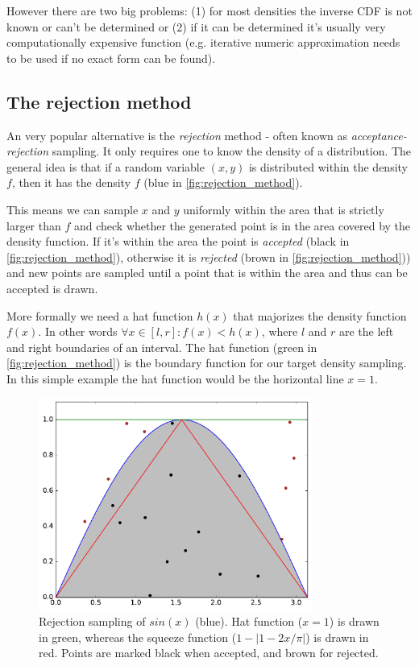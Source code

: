 \documentclass[]{article}
\begin{document}
However there are two big problems: (1) for most densities the inverse CDF is not known or can't be determined or (2) if it can be determined it's usually very computationally expensive function (e.g. iterative numeric approximation needs to be used if no exact form can be found).

\subsection{The rejection method}

An very popular alternative is the \textit{rejection} method - often known as \textit{acceptance-rejection} sampling. It only requires one to know the density of a distribution. The general idea is that if a random variable $(x, y)$ is distributed within the density $f$, then it has the density $f$ (blue in \autoref{fig:rejection_method}).

This means we can sample $x$ and $y$ uniformly within the area that is strictly larger than $f$ and check whether the generated point is in the area covered by the density function. If it's within the area the point is \textit{accepted} (black in \autoref{fig:rejection_method}), otherwise it is \textit{rejected} (brown in \autoref{fig:rejection_method})) and new points are sampled until a point that is within the area and thus can be accepted is drawn.

More formally we need a hat function $h(x)$ that majorizes the density function $f(x)$. In other words $ \forall x \in [l, r]: f(x) < h(x)$, where $l$ and $r$ are the left and right boundaries of an interval.
The hat function (green in \autoref{fig:rejection_method}) is the boundary function for our target density sampling. In this simple example the hat function would be the horizontal line $x = 1$.

\begin{figure}[h!]
\centering
\includegraphics[width=0.8\textwidth]{figs/rejection_sampling.pdf}
\caption{Rejection sampling of $sin(x)$ (blue). Hat function ($x = 1$) is drawn in green, whereas the squeeze function ($1 - |1 - 2x / \pi |$) is drawn in red. Points are marked black when accepted, and brown for rejected.}
\label{fig:rejection_method}
\end{figure}
\end{document}
